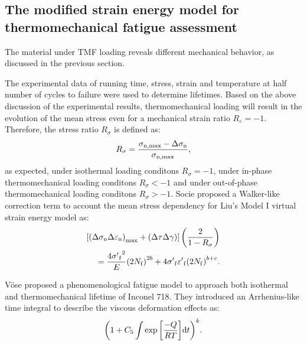 \documentclass[preprint,5p,twocolumn,11pt,sort&compress]{elsarticle}
\begin{document}
\subsection{The modified strain energy model for thermomechanical fatigue assessment}
\noindent
The material under TMF loading reveals different mechanical behavior, as discussed in the previous section. 

The experimental data of running time, stress, strain and temperature at half number of cycles to failure were used to determine lifetimes.
Based on the above discussion of the experimental results, thermomechanical loading  will result in the evolution of the mean stress even for a mechanical strain ratio $R_{\varepsilon}=-1$. Therefore, the stress ratio ${R_\sigma }$ is defined as:
\begin{equation}
{R_\sigma } = \frac{{{\sigma _{\rm n,\max }} - \Delta {\sigma _{\rm n}}}}{{{\sigma _{\rm n,\max }}}},
\end{equation}
as expected, under isothermal loading conditons ${R_\sigma }=-1$, under in-phase thermomechanical loading conditons ${R_\sigma }<-1$ and under out-of-phase thermomechanical loading conditons ${R_\sigma }>-1$.
Socie \cite{Socie2000} proposed a Walker-like correction term \cite{Walker1970} to account the mean stress dependency for Liu's Model I virtual strain energy model as:
\begin{equation}
\begin{aligned}
\left[ {{{\left( {\Delta {\sigma _{\rm n}}\Delta {\varepsilon _{\rm n}}} \right)}_{\max }} + \left( {\Delta \tau \Delta \gamma } \right)} \right]\left( {\frac{2}{{1 - {R_\sigma }}}} \right)\\
= \frac{{4{{\sigma '}_{\rm f}}^2}}{E}{\left( {2{N_{\rm f}}} \right)^{2b}} + 4{{\sigma '}_{\rm f}}{{\varepsilon '}_{\rm f}}{\left( {2{N_{\rm f}}} \right)^{b + c}}.
\end{aligned}
\label{Equ:StudyModel}
\end{equation}

V\"{o}se \cite{Vose2013} proposed a phenomenological fatigue model to approach both isothermal and thermomechanical lifetime of Inconel 718. They introduced an Arrhenius-like time integral to describe the viscous deformation effects as:
\begin{equation}
{\left( {1 + {C_5}\int {\exp \left[ {\frac{{ - Q}}{{RT}}} \right]} {\rm{d}}t} \right)^k}.
\end{equation}

\end{document}

